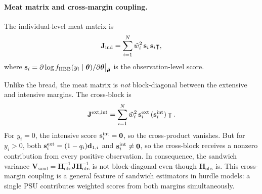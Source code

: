 
\paragraph{Meat matrix and cross-margin coupling.}
The individual-level meat matrix is
\begin{equation}\label{smc:eq-J-ind}
  \mathbf{J}_{\textup{ind}}
  = \sum_{i=1}^{N}\tilde{w}_i^2\,\mathbf{s}_i\,\mathbf{s}_i\intercal,
\end{equation}
where $\mathbf{s}_i
= \partial\log f_{\operatorname{HBB}}(y_i \mid \boldsymbol{\theta})/\partial\boldsymbol{\theta}
  \big|_{\hat{\boldsymbol{\theta}}}$
is the observation-level score.

\begin{remark}
\label{smc:rem-J-nonblockdiag}
  Unlike the bread, the meat matrix is \emph{not} block-diagonal between
  the extensive and intensive margins.  The cross-block is
  \begin{equation}\label{smc:eq-J-cross}
    \mathbf{J}^{\textup{ext,int}}
    = \sum_{i=1}^{N}\tilde{w}_i^2\,
      \mathbf{s}_i^{\textup{ext}}\,
      (\mathbf{s}_i^{\textup{int}})\intercal.
  \end{equation}
  For $y_i = 0$, the intensive score $\mathbf{s}_i^{\textup{int}}
  = \mathbf{0}$, so the cross-product vanishes.  But for $y_i > 0$,
  both $\mathbf{s}_i^{\textup{ext}} = (1-q_i)\mathbf{d}_{1,i}$ and
  $\mathbf{s}_i^{\textup{int}} \neq \mathbf{0}$, so the cross-block
  receives a nonzero contribution from every positive observation.  In
  consequence, the sandwich variance
  $\mathbf{V}_{\mathrm{sand}}
  = \mathbf{H}_{\mathrm{obs}}^{-1}\mathbf{J}\mathbf{H}_{\mathrm{obs}}^{-1}$
  is not block-diagonal even though $\mathbf{H}_{\mathrm{obs}}$ is.  This
  cross-margin coupling is a general feature of sandwich estimators in
  hurdle models: a single PSU contributes weighted scores from both
  margins simultaneously.
\end{remark}



